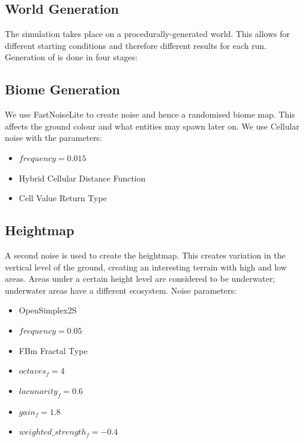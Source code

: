 \documentclass{article}
\begin{document}
\begin{multicols}{2}
        \section{World Generation}
        The simulation takes place on a procedurally-generated world. This allows for different starting conditions and therefore different results for each run.
        Generation of is done in four stages:
        
        \subsection{Biome Generation}
        
        We use FastNoiseLite \cite{FastNoiseLite} to create noise and hence a randomised biome map. This affects the ground colour and what entities may spawn later on. We use Cellular noise with the parameters:

        \begin{itemize}
            \setlength\itemsep{0.01em}
            \item $frequency = 0.015$
            \item Hybrid Cellular Distance Function
            \item Cell Value Return Type
        \end{itemize}
        
        \subsection{Heightmap}
        
        A second noise is used to create the heightmap. This creates variation in the vertical level of the ground, creating an interesting terrain with high and low areas. Areas under a certain height level are considered to be underwater; underwater areas have a different ecosystem. Noise parameters:

        \begin{itemize}
            \setlength\itemsep{0.01em}
            \item OpenSimplex2S
            \item $frequency = 0.05$
            \item FBm Fractal Type
            \item $octaves_f = 4$
            \item $lacunarity_f = 0.6$
            \item $gain_f = 1.8$
            \item $weighted\_strength_f = -0.4$
        \end{itemize}
        

\end{multicols}
\end{document}
